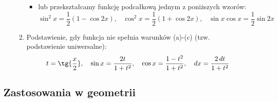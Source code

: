 \documentclass[10pt, twoside, fleqn]{article}
\begin{document}
\begin{enumerate}
\begin{enumerate}
\begin{itemize}
				
						
			\item lub przekształcamy funkcję podcałkową jednym z poniższych wzorów:
						\begin{equation*}
							\sin^2x=\frac{1}{2}(1-\cos2x), \hspace{10pt} 
							\cos^2x=\frac{1}{2}(1+\cos2x), \hspace{10pt}
							\sin x \cos x=\frac{1}{2}\sin2x
						\end{equation*}
						
							
						
		\end{itemize}
			\item Podstawienie, gdy funkcja nie spełnia warunków (a)-(c) (tzw. podstawienie uniwersalne):
						\begin{equation*}
							t=\tg{\frac{x}{2}}, \hspace{10pt} 
							\sin x=\frac{2t}{1+t^2},	 \hspace{10pt} 
							\cos x=\frac{1-t^2}{1+t^2},  \hspace{10pt} 
							dx=\frac{2\,dt}{1+t^2}
						\end{equation*}

		\end{enumerate}
			\end{enumerate}


	\newpage	
	\subsection{Zastosowania w geometrii}
\end{document}
